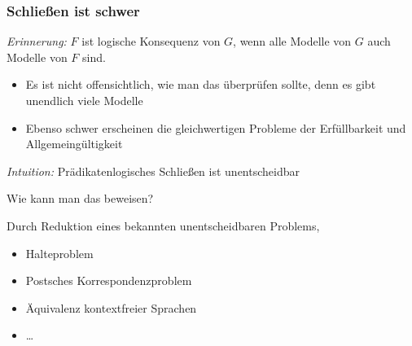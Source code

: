 \documentclass[aspectratio=1610,onlymath]{beamer}
\begin{document}
\maketitle

\begin{frame}\frametitle{Schließen ist schwer}

\emph{Erinnerung:} $F$ ist logische Konsequenz von $G$, wenn alle Modelle von $G$ auch Modelle von $F$ sind.
\begin{itemize}
\item Es ist nicht offensichtlich, wie man das überprüfen sollte, denn es gibt unendlich viele Modelle
\item Ebenso schwer erscheinen die gleichwertigen Probleme der Erfüllbarkeit und Allgemeingültigkeit
\end{itemize}\pause
\emph{Intuition:} Prädikatenlogisches Schließen ist unentscheidbar
\bigskip

\alert{Wie kann man das beweisen?}\pause\bigskip

Durch Reduktion eines bekannten unentscheidbaren Problems, 
\begin{itemize}
\item Halteproblem
\item Postsches Korrespondenzproblem
\item Äquivalenz kontextfreier Sprachen
\item \ldots
\end{itemize}

\end{frame}
\end{document}
